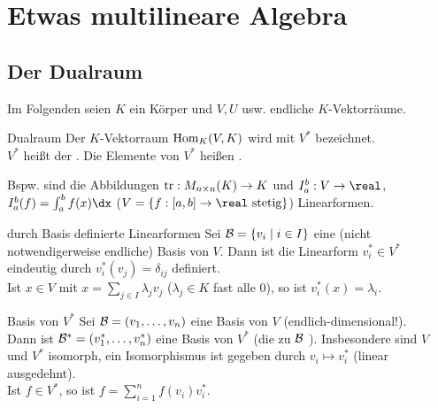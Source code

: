 \chapter{%
    Etwas multilineare Algebra%
}

\section{%
    Der Dualraum%
}

\begin{Bem}
    Im Folgenden seien $K$ ein Körper und $V, U$ usw. endliche $K$-Vektorräume.
\end{Bem}

\begin{Def}{Dualraum}
    Der $K$-Vektorraum $\operatorname{Hom}_K(V, K)$ wird mit $V^\ast$ bezeichnet. \\
    $V^\ast$ heißt der .
    Die Elemente von $V^\ast$ heißen .
\end{Def}

\begin{Bem}
    Bspw. sind die Abbildungen $\operatorname{tr}: M_{n \times n}(K) \rightarrow K$ und
    $I_a^b: V \rightarrow \real$,\\
    $I_a^b(f) = \int_a^b f(x)\dx$
    ($V = \{f: [a,b] \rightarrow \real \text{ stetig}\}$) Linearformen.
\end{Bem}

\begin{Def}{durch Basis definierte Linearformen}
    Sei $\mathcal{B} = \{v_i \;|\; i \in I\}$ eine (nicht notwendigerweise
    endliche) Basis von $V$.
    Dann ist die Linearform $v_i^\ast \in V^\ast$ eindeutig durch
    $v_i^\ast(v_j) = \delta_{ij}$ definiert. \\
    Ist $x \in V$ mit $x = \sum_{j \in I} \lambda_j v_j$ ($\lambda_j \in K$
    fast alle $0$), so ist $v_i^\ast(x) = \lambda_i$.
\end{Def}

\begin{Satz}{Basis von $V^\ast$}
    Sei $\mathcal{B} = (v_1, \ldots, v_n)$ eine Basis von $V$
    (endlich-dimensional!). \\
    Dann ist $\mathcal{B}^\ast = (v_1^\ast, \ldots, v_n^\ast)$ eine Basis von
    $V^\ast$ (die zu $\mathcal{B}$ ).
    Insbesondere sind $V$ und $V^\ast$ isomorph, ein Isomorphismus ist gegeben
    durch $v_i \mapsto v_i^\ast$ (linear ausgedehnt). \\
    Ist $f \in V^\ast$, so ist $f = \sum_{i=1}^n f(v_i) v_i^\ast$.
\end{Satz}

